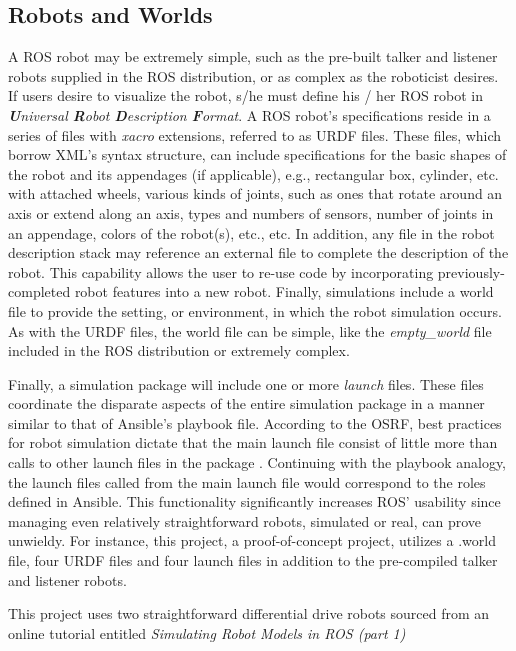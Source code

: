 \documentclass[9pt,twocolumn,twoside]{../../styles/osajnl}
\begin{document}
\subsection{Robots and Worlds}
A ROS robot may be extremely simple, such as the pre-built talker and listener robots supplied in the ROS distribution, or as complex as the roboticist desires.  If users desire to visualize the robot, s/he must define his / her ROS robot in \textit{\textbf{U}niversal \textbf{R}obot \textbf{D}escription \textbf{F}ormat}.  A ROS robot's specifications reside in a series of files with \textit{xacro} extensions, referred to as URDF files.  These files, which borrow XML's syntax structure, can include specifications for the basic shapes of the robot and its appendages (if applicable), e.g., rectangular box, cylinder, etc. with attached wheels, various kinds of joints, such as ones that rotate around an axis or extend along an axis, types and numbers of sensors, number of joints in an appendage, colors of the robot(s), etc., etc.  In addition, any file in the robot description stack may reference an external file to complete the description of the robot.  This capability allows the user to re-use code by incorporating previously-completed robot features into a new robot.  Finally, simulations include a world file to provide the setting, or environment, in which the robot simulation occurs.  As with the URDF files, the world file can be simple, like the \textit{empty\_world} file included in the ROS distribution or extremely complex.  

Finally, a simulation package will include one or more \textit{launch} files.  These files coordinate the disparate aspects of the entire simulation package in a manner similar to that of Ansible's playbook file.  According to the OSRF, best practices for robot simulation dictate that the main launch file consist of little more than calls to other launch files in the package \cite{www-ros-launch}.  Continuing with the playbook analogy, the launch files called from the main launch file would correspond to the roles defined in Ansible.  This functionality significantly increases ROS' usability since managing even relatively straightforward robots, simulated or real, can prove unwieldy. For instance, this project, a proof-of-concept project, utilizes a .world file, four URDF files and four launch files in addition to the pre-compiled talker and listener robots.  

This project uses two straightforward differential drive robots sourced from an online tutorial entitled \textit{Simulating Robot Models in ROS (part 1)} \cite{www-mybot-moore}
\end{document}
